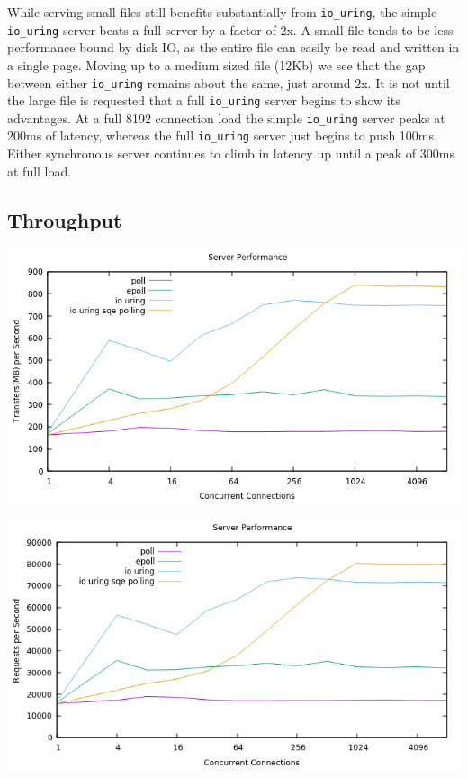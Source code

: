 \documentclass[letterpaper, 10pt, twocolumn]{article}
\begin{document}
While serving small files still benefits substantially from \texttt{io\_uring}, the simple \texttt{io\_uring} server beats a full server by a factor of 2x. A small file tends to be less performance bound by disk IO, as the entire file can easily be read and written in a single page. Moving up to a medium sized file (12Kb) we see that the gap between either \texttt{io\_uring} remains about the same, just around 2x. It is not until the large file is requested that a full \texttt{io\_uring} server begins to show its advantages. At a full 8192 connection load the simple \texttt{io\_uring} server peaks at 200ms of latency, whereas the full \texttt{io\_uring} server just begins to push 100ms. Either synchronous server continues to climb in latency up until a peak of 300ms at full load.
\subsection{Throughput}
\label{sec:org8cc32f2}

\begin{center}
\includegraphics[width=.9\linewidth]{mbps.pn.png}
\end{center}
\begin{center}
\includegraphics[width=.9\linewidth]{rps.png}
\end{center}
\end{document}
